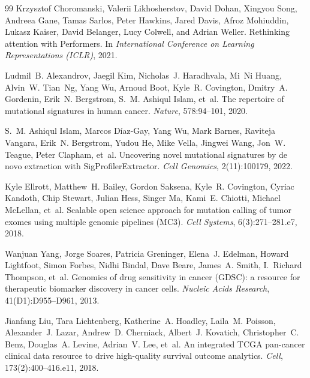 \begin{thebibliography}{99}
Krzysztof Choromanski, Valerii Likhosherstov, David Dohan, Xingyou Song, Andreea Gane,
  Tamas Sarlos, Peter Hawkins, Jared Davis, Afroz Mohiuddin, Lukasz Kaiser, David Belanger, Lucy
  Colwell, and Adrian Weller.
\newblock Rethinking attention with Performers.
\newblock In \emph{International Conference on Learning Representations (ICLR)}, 2021.

Ludmil~B. Alexandrov, Jaegil Kim, Nicholas~J. Haradhvala, Mi~Ni Huang, Alvin~W. Tian~Ng, Yang
  Wu, Arnoud Boot, Kyle~R. Covington, Dmitry~A. Gordenin, Erik~N. Bergstrom, S.~M. Ashiqul
  Islam, et~al.
\newblock The repertoire of mutational signatures in human cancer.
\newblock \emph{Nature}, 578:94--101, 2020.

S.~M. Ashiqul Islam, Marcos D\'{i}az-Gay, Yang Wu, Mark Barnes, Raviteja Vangara, Erik~N.
  Bergstrom, Yudou He, Mike Vella, Jingwei Wang, Jon~W. Teague, Peter Clapham, et~al.
\newblock Uncovering novel mutational signatures by de novo extraction with SigProfilerExtractor.
\newblock \emph{Cell Genomics}, 2(11):100179, 2022.

Kyle Ellrott, Matthew~H. Bailey, Gordon Saksena, Kyle~R. Covington, Cyriac Kandoth, Chip
  Stewart, Julian Hess, Singer Ma, Kami~E. Chiotti, Michael McLellan, et~al.
\newblock Scalable open science approach for mutation calling of tumor exomes using multiple genomic
  pipelines (MC3).
\newblock \emph{Cell Systems}, 6(3):271--281.e7, 2018.

Wanjuan Yang, Jorge Soares, Patricia Greninger, Elena~J. Edelman, Howard Lightfoot, Simon
  Forbes, Nidhi Bindal, Dave Beare, James~A. Smith, I.~Richard Thompson, et~al.
\newblock Genomics of drug sensitivity in cancer (GDSC): a resource for therapeutic biomarker
  discovery in cancer cells.
\newblock \emph{Nucleic Acids Research}, 41(D1):D955--D961, 2013.

Jianfang Liu, Tara Lichtenberg, Katherine~A. Hoadley, Laila~M. Poisson, Alexander~J. Lazar,
  Andrew~D. Cherniack, Albert~J. Kovatich, Christopher~C. Benz, Douglas~A. Levine, Adrian~V. Lee,
  et~al.
\newblock An integrated TCGA pan-cancer clinical data resource to drive high-quality survival outcome
  analytics.
\newblock \emph{Cell}, 173(2):400--416.e11, 2018.

\end{thebibliography}
